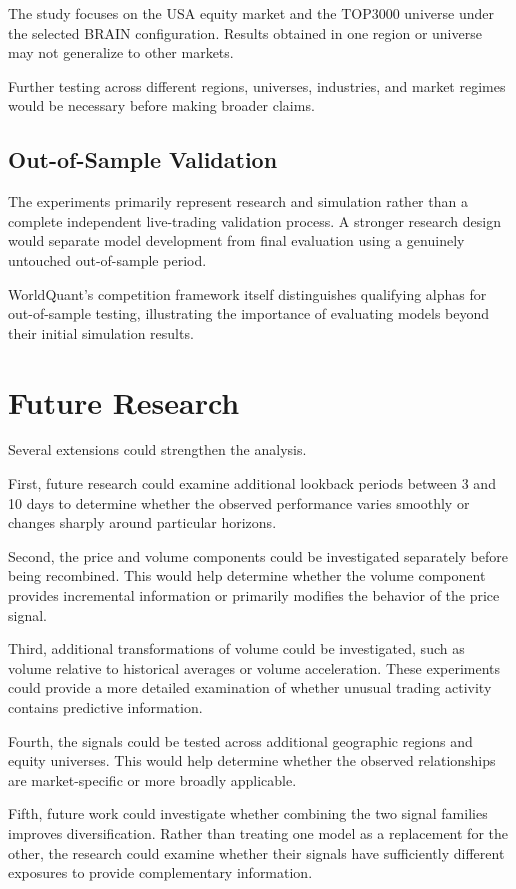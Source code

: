\documentclass{article}
\begin{document}
The study focuses on the USA equity market and the TOP3000 universe under the selected BRAIN configuration. Results obtained in one region or universe may not generalize to other markets.

Further testing across different regions, universes, industries, and market regimes would be necessary before making broader claims.

\subsection{Out-of-Sample Validation}

The experiments primarily represent research and simulation rather than a complete independent live-trading validation process. A stronger research design would separate model development from final evaluation using a genuinely untouched out-of-sample period.

WorldQuant's competition framework itself distinguishes qualifying alphas for out-of-sample testing, illustrating the importance of evaluating models beyond their initial simulation results. 

\section{Future Research}

Several extensions could strengthen the analysis.

First, future research could examine additional lookback periods between 3 and 10 days to determine whether the observed performance varies smoothly or changes sharply around particular horizons.

Second, the price and volume components could be investigated separately before being recombined. This would help determine whether the volume component provides incremental information or primarily modifies the behavior of the price signal.

Third, additional transformations of volume could be investigated, such as volume relative to historical averages or volume acceleration. These experiments could provide a more detailed examination of whether unusual trading activity contains predictive information.

Fourth, the signals could be tested across additional geographic regions and equity universes. This would help determine whether the observed relationships are market-specific or more broadly applicable.

Fifth, future work could investigate whether combining the two signal families improves diversification. Rather than treating one model as a replacement for the other, the research could examine whether their signals have sufficiently different exposures to provide complementary information.
\end{document}
